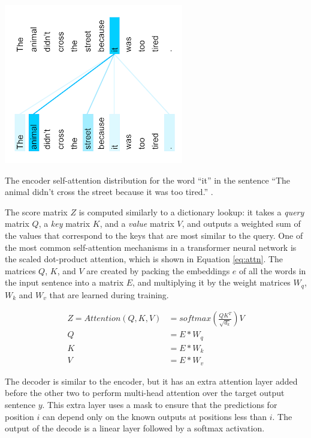 \begin{table}[h]
    \centering
    \includegraphics[width=0.5\columnwidth]{imgs/background/attn.png}
    \caption{The encoder self-attention distribution for the word ``it'' in the sentence
    ``The animal didn't cross the street because it was too tired.'' \cite{vaswani2017attention}.}
    \label{fig:attn}
\end{table}

The score matrix $Z$ is computed similarly to a dictionary lookup: it takes a \textit{query} matrix $Q$, a \textit{key} matrix $K$, and a \textit{value} matrix $V$, and outputs a weighted sum of the values that correspond to the keys that are most similar to the query. One of the most common self-attention mechanisms in a transformer neural network is the scaled dot-product attention, which is shown in Equation \ref{eq:attn}. The matrices $Q$, $K$, and $V$ are created by packing the embeddings $e$ of all the words in the input sentence into a matrix $E$, and multiplying it by the weight matrices $W_q$, $W_k$ and $W_v$ that are learned during training.

\begin{equation}\label{eq:attn}
\begin{split}
    Z = Attention(Q, K, V) &= softmax(\frac{QK^T}{\sqrt{d_k}})V \\
    Q &= E * W_q \\
    K &= E * W_k \\
    V &= E * W_v
\end{split}
\end{equation}

The decoder is similar to the encoder, but it has an extra attention layer added before the other two to perform multi-head attention over the target output sentence $y$. This extra layer uses a mask to ensure that the predictions for position $i$ can depend only on the known outputs at positions less than $i$. The output of the decode is a linear layer followed by a softmax activation.

